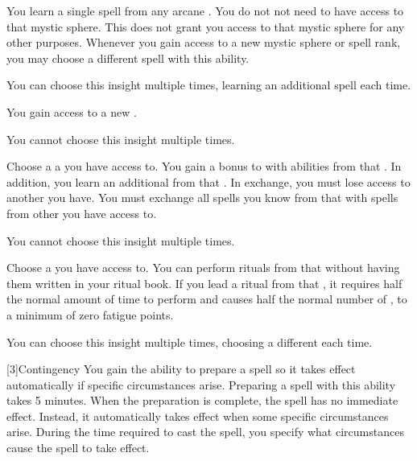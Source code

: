         {
             You learn a single spell from any arcane .
            You do not not need to have access to that mystic sphere.
            This does not grant you access to that mystic sphere for any other purposes.
            Whenever you gain access to a new mystic sphere or spell rank, you may choose a different spell with this ability.
            \par You can choose this insight multiple times, learning an additional spell each time.

             You gain access to a new .
            \par You cannot choose this insight multiple times.

             Choose a a  you have access to.
            You gain a  bonus to  with abilities from that .
            In addition, you learn an additional  from that .
            In exchange, you must lose access to another  you have.
            You must exchange all spells you know from that  with spells from other  you have access to.
            \par You cannot choose this insight multiple times.

            Choose a  you have access to.
            You can perform rituals from that  without having them written in your ritual book.
            If you lead a ritual from that , it requires half the normal amount of time to perform and causes half the normal number of , to a minimum of zero fatigue points.
            \par You can choose this insight multiple times, choosing a different  each time.
        }

        [3]{Contingency} You gain the ability to prepare a spell so it takes effect automatically if specific circumstances arise.
        Preparing a spell with this ability takes 5 minutes.
        When the preparation is complete, the spell has no immediate effect.
        Instead, it automatically takes effect when some specific circumstances arise.
        During the time required to cast the spell, you specify what circumstances cause the spell to take effect.

